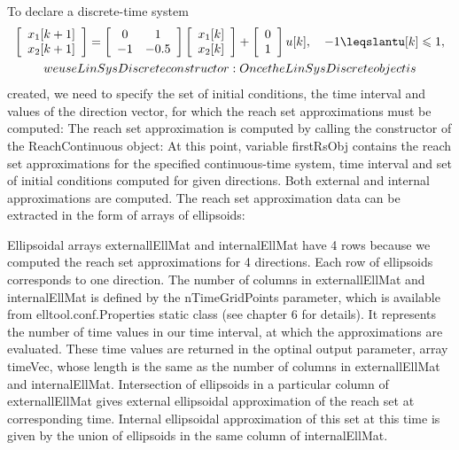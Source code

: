\documentclass[letterpaper,10pt,english]{sphinxmanual}
\begin{document}
To declare a discrete-time system
\begin{gather}
\begin{split}  \left[\begin{array}{c}
  x_1[k+1]\\
  x_2[k+1]\end{array}\right] = \left[\begin{array}{cc}
  0 & 1\\
  -1 & -0.5\end{array}\right]\left[\begin{array}{c}
  x_1[k]\\
  x_2[k]\end{array}\right] + \left[\begin{array}{c}
  0\\
  1\end{array}\right]u[k], ~~~ -1\leqslantu[k]\leqslant1,\end{split}\notag\\\begin{split}we use LinSysDiscrete constructor: Once the LinSysDiscrete object is\end{split}\notag
\end{gather}
created, we need to specify the set of initial conditions, the time
interval and values of the direction vector, for which the reach set
approximations must be computed: The reach set approximation is computed
by calling the constructor of the ReachContinuous object: At this point,
variable firstRsObj contains the reach set approximations for the
specified continuous-time system, time interval and set of initial
conditions computed for given directions. Both external and internal
approximations are computed. The reach set approximation data can be
extracted in the form of arrays of ellipsoids:

Ellipsoidal arrays externallEllMat and internalEllMat have 4
rows because we computed the reach set approximations for 4
directions. Each row of ellipsoids corresponds to one direction. The
number of columns in externallEllMat and internalEllMat is defined by
the nTimeGridPoints parameter, which is available from
elltool.conf.Properties static class (see chapter 6 for details). It
represents the number of time values in our time interval, at which the
approximations are evaluated. These time values are returned in the
optinal output parameter, array timeVec, whose length is the same as the
number of columns in externallEllMat and internalEllMat. Intersection of
ellipsoids in a particular column of externallEllMat gives external
ellipsoidal approximation of the reach set at corresponding time.
Internal ellipsoidal approximation of this set at this time is given by
the union of ellipsoids in the same column of internalEllMat.
\end{document}
